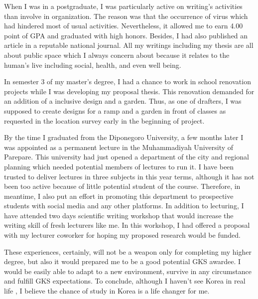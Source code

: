 \documentclass[../main.tex]{subfiles}
\begin{document}
When I was in a postgraduate, I was particularly active on writing's activities than involve in organization. The reason was that the occurrence of virus which had hindered most of usual activities. Nevertheless, it allowed me to earn 4.00 point of GPA and graduated with high honors. Besides, I had also published an article in a reputable national journal. All my writings including my thesis are all about public space which I always concern about because it relates to the human's live including social, health, and even well being.

In semester 3 of my master's degree, I had a chance to work in school renovation projects while I was developing my proposal thesis. This renovation demanded for an addition of a inclusive design and a garden. Thus, as one of drafters, I was supposed to create designs for a ramp and a garden in front of classes as requested in the location survey early in the beginning of project. %

By the time I graduated from the Diponegoro University, a few months later I was appointed as a permanent lecture in the Muhammadiyah University of Parepare.
This university had just opened a department of the city and regional planning which needed potential members of lectures to run it.
I have been trusted to deliver lectures in three subjects in this year terms, although it has not been too active because of little potential student of the course.
Therefore, in meantime, I also put an effort in promoting this department to prospective students with social media and any other platforms.
In addition to lecturing, I have attended two days scientific writing workshop that would increase the writing skill of fresh lecturers like me. In this workshop, I had offered a proposal with my lecturer coworker for hoping my proposed research would be funded.

These experiences, certainly, will not be a weapon only for completing my higher degree, but also it would prepared me to be a good potential GKS awardee. I would be easily able to adapt to a new environment, survive in any circumstance and fulfill GKS expectations. To conclude, although I haven't see Korea in real life , I believe the chance of study in Korea is a life changer for me.




%

%
\end{document}

